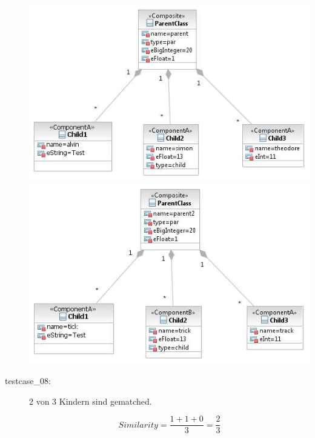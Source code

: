 \documentclass[a4paper]{article}
\begin{document}
\begin{description}
	\includegraphics[scale=0.5]{CompareChildrenMatchedOrSimilarTestScreens/Testcase07model1.jpeg}
	\includegraphics[scale=0.5]{CompareChildrenMatchedOrSimilarTestScreens/Testcase07model2.jpeg}

  \item[testcase\_08:]  2 von 3 Kindern sind gematched.
    
   \begin{equation*}
   Similarity = \frac{1+1+0}{3}=\frac{2}{3}
   \end{equation*}
       

\end{description}
\end{document}
